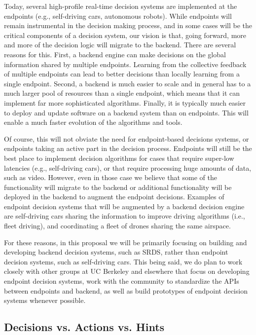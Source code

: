 Today, several high-profile real-time decision systems are implemented at the endpoints (e.g., self-driving cars, autonomous robots). While endpoints will remain instrumental in the decision making process, and in some cases will be the critical components of a decision system, our vision is that, going forward, more and more of the decision logic will migrate to the backend. There are several reasons for this. First, a backend engine can make decisions on the global information shared by multiple endpoints. Learning from the collective feedback of multiple endpoints can lead to better decisions than locally learning from a single endpoint. Second, a backend is much easier to scale and in general has to a much larger pool of resources than a single endpoint, which means that it can implement far more sophisticated algorithms. Finally, it is typically much easier to deploy and update software on a backend system than on endpoints. This will enable a much faster evolution of the algorithms and tools.

Of course, this will not obviate the need for endpoint-based decisions systems, or endpoints taking an active part in the decision process. Endpoints will still be the best place to implement decision algorithms for cases that require super-low latencies (e.g., self-driving cars), or that require processing huge amounts of data, such as video. However, even in those case we believe that some of the functionality will migrate to the backend or additional functionality will be deployed in the backend to augment the endpoint decisions. Examples of endpoint decision systems that will be augmented by a backend decision engine are self-driving cars sharing the information to improve driving algorithms (i.e., fleet driving), and coordinating a fleet of drones sharing the same airspace.  

For these reasons, in this proposal we will be primarily focusing on building and developing backend decision systems, such as SRDS, rather than endpoint decision systems, such as self-driving cars. This being said, we do plan to work closely with other groups at UC Berkeley and elsewhere that focus on developing endpoint decision systems, work with the community to standardize the APIs between endpoints and backend, as well as build prototypes of endpoint decision systems whenever possible.  

\subsection{Decisions vs. Actions vs. Hints}

